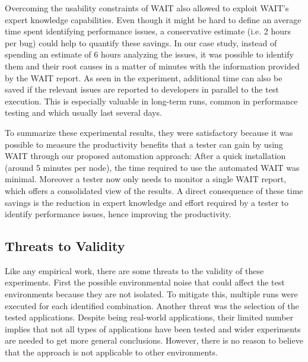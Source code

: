\documentclass[runningheads,a4paper]{llncs}
\begin{document}
Overcoming the usability constraints of WAIT also allowed to exploit
WAIT's expert knowledge capabilities. Even though it might be hard to define an
average time spent identifying performance issues, a conservative estimate (i.e.
2 hours per bug) could help to quantify these savings. In our case study,
instead of spending an estimate of 6 hours analyzing the issues, it was possible to
identify them and their root causes in a matter of minutes with the information
provided by the WAIT report. As seen in the experiment, additional time can
also be saved if the relevant issues are reported to developers in parallel to
the test execution. This is especially valuable in long-term runs, common in performance
testing and which usually last several days.

To summarize these experimental results, they were satisfactory because it was
possible to measure the productivity benefits that a tester can gain by using
WAIT through our proposed automation approach: After a quick installation
(around 5 minutes per node), the time required to use the automated WAIT was
minimal. Moreover a tester now only needs to monitor a single WAIT report, which
offers a consolidated view of the results. A direct consequence of these
time savings is the reduction in expert knowledge and effort required by a
tester to identify performance issues, hence improving the productivity.

\vspace{-5pt}
\subsection{Threats to Validity}
\vspace{-5pt}
Like any empirical work, there are some threats to the validity of these
experiments. First the possible environmental noise that could affect the test
environments because they are not isolated. To mitigate this, multiple runs were
executed for each identified combination. Another threat was the selection of
the tested applications. Despite being real-world applications, their limited
number implies that not all types of applications have been tested and wider
experiments are needed to get more general conclusions. However, there is no
reason to believe that the approach is not applicable to other environments.

\vspace{-10pt}
\end{document}
